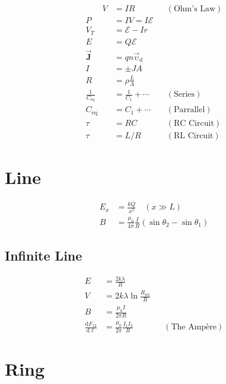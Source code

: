 \documentclass[10pt]{article}
\newcommand{\id}[1]{\mathrm{d} #1}
\newcommand{\bvec}[1]{\vec{\mathbf{#1}}}
\begin{document}
\begin{multicols*}{5}
\begin{align*}
    \hspace{2em} V &= IR && (\text{Ohm's Law})\\
    P &= IV = I \mathcal{E}\\
    V_T &= \mathcal{E} - Ir\\
    E &= Q \mathcal{E}\\
    \bvec{J} &= qn\vec{\upsilon}_\mathrm{d}\\
    I &= \pm JA\\
    R &= \rho \frac{L}{A}\\
    \frac{1}{C_{\text{eq}}} &= \frac{1}{C_1} + \cdots &&
    (\text{Series})\\
    C_{\text{eq}} &= C_1 + \cdots && (\text{Parrallel})\\
    \tau &= RC && (\text{RC Circuit})\\
    \tau &= L/R && (\text{RL Circuit})
\end{align*}

\section{Line}

\begin{align*}
    E_x &= \frac{kQ}{x^2} \quad (x \gg L)\\
    B &= \frac{\mu_0}{4\pi} \frac{I}{R} \left({\sin \theta_2 - \sin
	    \theta_1}\right)
\end{align*}

\subsection{Infinite Line}

\begin{align*}
    E &= \frac{2k\lambda}{R}\\
    V &= 2k\lambda \ln \frac{R_\text{ref}}{R}\\
    B &= \frac{\mu_0 I}{2\pi R}\\
    \frac{\id{F_{12}}}{\id{\ell}} &= \frac{\mu_0}{2\pi} \frac{I_1 I_2}
    {R} && (\text{The Amp\`{e}re})
\end{align*}

\vspace*{20ex}
\section{Ring}


\end{multicols*}
\end{document}

